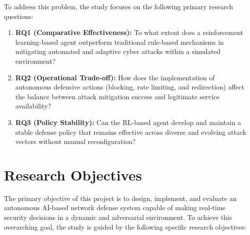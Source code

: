 \documentclass[12pt,a4paper]{report}
\begin{document}
To address this problem, the study focuses on the following primary research questions:

\begin{enumerate}
    \item \textbf{RQ1 (Comparative Effectiveness):} To what extent does a reinforcement learning-based agent outperform traditional rule-based mechanisms in mitigating automated and adaptive cyber attacks within a simulated environment?
    
    \item \textbf{RQ2 (Operational Trade-off):} How does the implementation of autonomous defensive actions (blocking, rate limiting, and redirection) affect the balance between attack mitigation success and legitimate service availability?
    
    \item \textbf{RQ3 (Policy Stability):} Can the RL-based agent develop and maintain a stable defense policy that remains effective across diverse and evolving attack vectors without manual reconfiguration?
\end{enumerate}

\section{Research Objectives}

The primary objective of this project is to design, implement, and evaluate an autonomous AI-based network defense system capable of making real-time security decisions in a dynamic and adversarial environment.
To achieve this overarching goal, the study is guided by the following specific research objectives:
\end{document}
